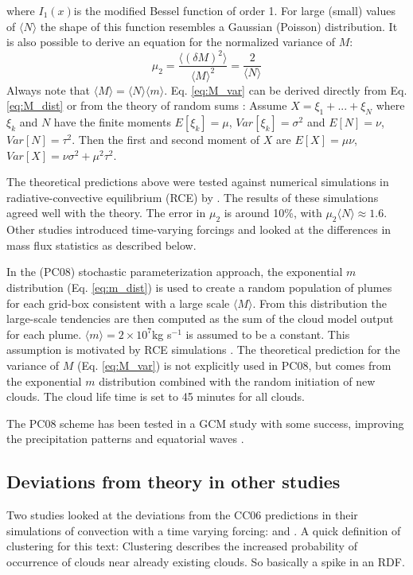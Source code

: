 \documentclass[a4paper, 12pt]{article}
\begin{document}
where $I_1(x)$is the modified Bessel function of order 1. For large (small) values of $\langle N \rangle$ the shape of this function resembles a Gaussian (Poisson) distribution.   
It is also possible to derive an equation for the normalized variance of $M$:
\begin{equation} \label{eq:M_var}
 \mu_2 = \frac{\langle (\delta M)^2 \rangle}{\langle M \rangle^2} = \frac{2}{\langle N \rangle}
\end{equation}
Always note that $\langle M \rangle = \langle N \rangle \langle m \rangle$. Eq. \ref{eq:M_var} can be derived directly from Eq. \ref{eq:M_dist} or from the theory of random sums \cite[][p.70ff]{Taylor1998}:
Assume $X=\xi_1 + ... + \xi_N$ where $\xi_k$ and $N$ have the finite moments $E[\xi_k]=\mu$, $Var[\xi_k]=\sigma^2$ and $E[N]=\nu$, $Var[N]=\tau^2$. Then the first and second moment of $X$ are $E[X]=\mu\nu$, $Var[X]=\nu\sigma^2 + \mu^2\tau^2$.

The theoretical predictions above were tested against numerical simulations in radiative-convective equilibrium (RCE) by \cite{Cohen2006}. The results of these simulations agreed well with the theory. The error in $\mu_2$ is around 10\%, with $\mu_2 \langle N \rangle \approx 1.6$. Other studies introduced time-varying forcings and looked at the differences in mass flux statistics as described below.

In the \cite{Plant2008}(PC08) stochastic parameterization approach, the exponential $m$ distribution (Eq. \ref{eq:m_dist}) is used to create a random population of plumes for each grid-box consistent with a large scale $\langle M \rangle$. From this distribution the large-scale tendencies are then computed as the sum of the cloud model output for each plume. $\langle m \rangle = 2 \times 10^7$kg s$^{-1}$ is assumed to be a constant. This assumption is motivated by RCE simulations \citep[e.g.][]{Cohen2006}. The theoretical prediction for the variance of $M$ (Eq. \ref{eq:M_var}) is not explicitly used in PC08, but comes from the exponential $m$ distribution combined with the random initiation of new clouds. The cloud life time is set to 45 minutes for all clouds. 

The PC08 scheme has been tested in a GCM study with some success, improving the precipitation patterns and equatorial waves \citep{Wang2016}.

\subsection{Deviations from theory in other studies}
Two studies looked at the deviations from the CC06 predictions in their simulations of convection with a time varying forcing: \cite{Davies2008} and \cite{Davoudi2010}. A quick definition of clustering for this text: Clustering describes the increased probability of occurrence of clouds near already existing clouds. So basically a spike in an RDF. 
\end{document}
